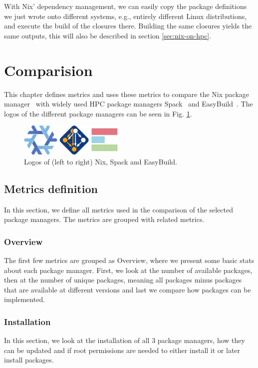 \documentclass[conference,final,a4paper]{IEEEtran}
\begin{document}
With Nix' dependency management, we can easily copy the package definitions we just wrote onto different systems, e.g., entirely different Linux distributions, and execute the build of the closures there.
Building the same closures yields the same outputs, this will also be described in section \ref{sec:nix-on-hpc}.

\section{Comparision}

This chapter defines metrics and uses these metrics to compare the Nix package manager~\cite{Dolstra_2004} with widely used HPC package managers Spack~\cite{Gamblin_2015} and EasyBuild~\cite{Geimer_2014}.
The logos of the different package managers can be seen in Fig. \ref{fig:pm-logos}.

\begin{figure}
    \centering
    \includegraphics[width=0.45\textwidth]{pm-logos.png}
    \caption{Logos of (left to right) Nix\cite{nix-logo}, Spack\cite{spack-logo} and EasyBuild\cite{easybuild-logo}.}
    \label{fig:pm-logos}
\end{figure}

\subsection{Metrics definition}

In this section, we define all metrics used in the comparison of the selected package managers.
The metrics are grouped with related metrics.\\

\subsubsection{Overview}
The first few metrics are grouped as Overview, where we present some basic stats about each package manager.
First, we look at the number of available packages, then at the number of unique packages, meaning all packages minus packages that are available at different versions and last we compare how packages can be implemented.\\

\subsubsection{Installation}
In this section, we look at the installation of all 3 package managers, how they can be updated and if root permissions are needed to either install it or later install packages.\\
\end{document}
